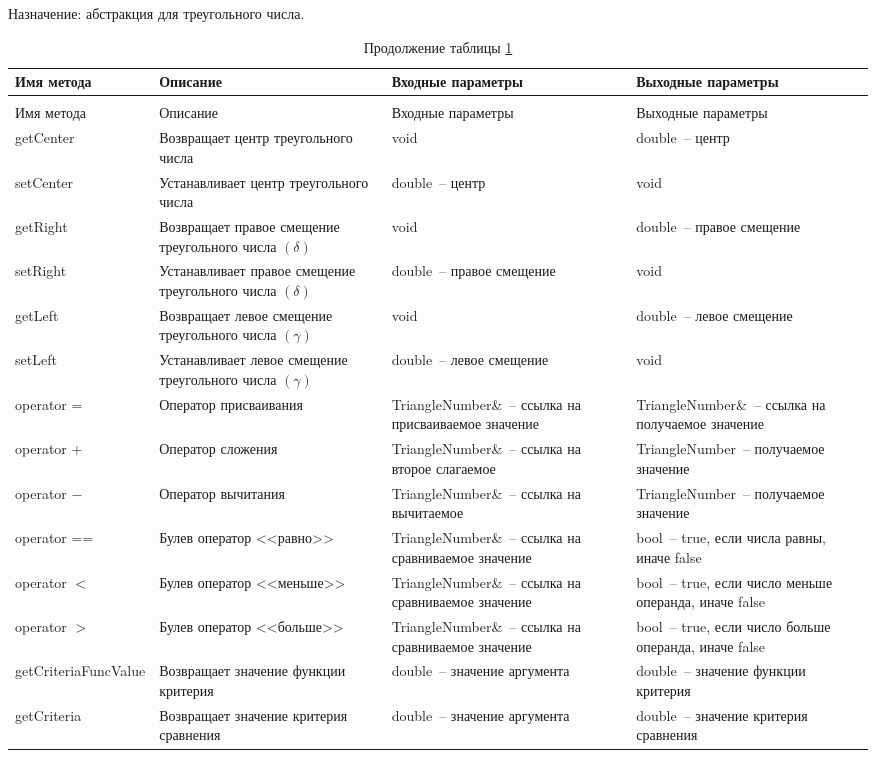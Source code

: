 \documentclass[a4paper,14pt,russian]{extreport}
\makeatletter
\renewcommand{\subsubsection}{\@startsection{subsubsection}{3}{\parindent}{3ex}{3ex}{\normalfont}}
\makeatother
\begin{document}
\subsubsection{Класс TriangleNumber}

Назначение: абстракция для треугольного числа.

\begin{longtable}{|m{3 cm}|m{3 cm}|m{4 cm}|m{4 cm}|}
\caption{Методы класса TriangleNumber\label{tab:trianglenumber}} \\
\hline 
Имя метода & Описание & Входные параметры & Выходные параметры \\
\hline
\endfirsthead
\caption*{Продолжение таблицы \ref{tab:trianglenumber}} \\
\hline
Имя метода & Описание & Входные параметры & Выходные параметры \\
\endhead
{get\-Center} & Возвращает центр треугольного числа & void & double~-- центр \\
\hline
{set\-Center} & Устанавливает центр треугольного числа & double~-- центр & void \\
\hline
{get\-Right} & Возвращает правое смещение треугольного числа $\left(\delta\right)$ & void & double~-- правое смещение \\
\hline
{set\-Right} & Устанавливает правое смещение треугольного числа $\left(\delta\right)$ & double~-- правое смещение & void \\
\hline
{get\-Left} & Возвращает левое смещение треугольного числа $\left(\gamma\right)$ & void & double~-- левое смещение \\
\hline
{set\-Left} & Устанавливает левое смещение треугольного числа $\left(\gamma\right)$ & double~-- левое смещение & void \\
\hline
operator = & Оператор присваивания & TriangleNumber\&~-- ссылка на присваиваемое значение & TriangleNumber\&~-- ссылка на получаемое значение \\
\hline
operator + & Оператор сложения & TriangleNumber\&~-- ссылка на второе слагаемое & TriangleNumber~-- получаемое значение \\
\hline
operator $-$ & Оператор вычитания & TriangleNumber\&~-- ссылка на вычитаемое & TriangleNumber~-- получаемое значение \\
\hline
operator == & Булев оператор <<равно>> & TriangleNumber\&~-- ссылка на сравниваемое значение & bool~-- true, если числа равны, иначе false \\
\hline
operator $<$ & Булев оператор <<меньше>> & TriangleNumber\&~-- ссылка на сравниваемое значение & bool~-- true, если число меньше операнда, иначе false \\
\hline
operator $>$ & Булев оператор <<больше>> & TriangleNumber\&~-- ссылка на сравниваемое значение & bool~-- true, если число больше операнда, иначе false \\
\hline
{get\-Criteria\-Func\-Value} & Возвращает значение функции критерия & double~-- значение аргумента & double~-- значение функции критерия \\
\hline
{get\-Criteria} & Возвращает значение критерия сравнения & double~-- значение аргумента & double~-- значение критерия сравнения \\
\hline
\end{longtable}
\end{document}
